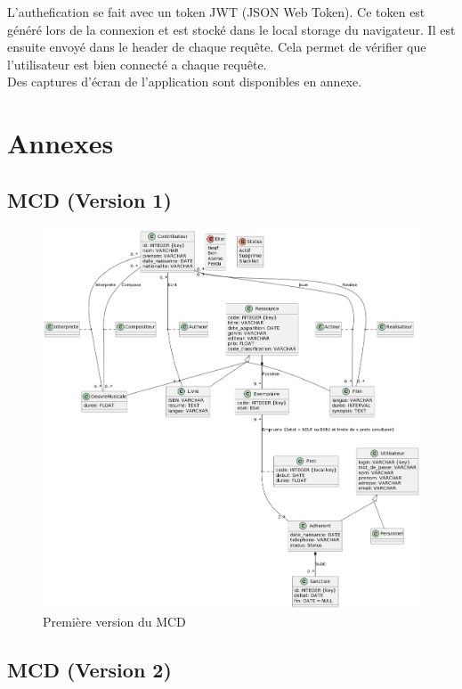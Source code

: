 \documentclass{report-UTC}
\begin{document}
L'authefication se fait avec un token JWT (JSON Web Token). Ce token est généré
lors de la connexion et est stocké dans le local storage du navigateur. Il est
ensuite envoyé dans le header de chaque requête. Cela permet de vérifier que    
l'utilisateur est bien connecté a chaque requête. \\

Des captures d'écran de l'application sont disponibles en annexe.

\section{Annexes}
\subsection{MCD (Version 1)}

\begin{figure}[H]
\centering
\includegraphics[width=15cm]{../Rendu1/mcd.png}
\caption{Première version du MCD}
\end{figure}

\subsection{MCD (Version 2)}
\end{document}
